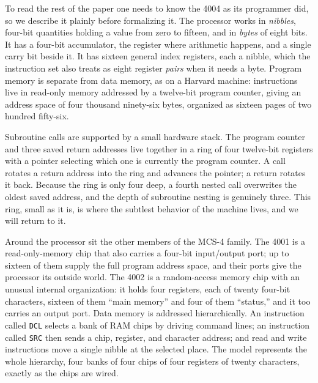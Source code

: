 \documentclass[11pt]{amsart}
\theoremstyle{plain}
\theoremstyle{definition}
\newcommand{\code}[1]{\texttt{#1}}
\begin{document}
To read the rest of the paper one needs to know the 4004 as its programmer did, so we describe it plainly before formalizing it. The processor works in \emph{nibbles}, four-bit quantities holding a value from zero to fifteen, and in \emph{bytes} of eight bits. It has a four-bit accumulator, the register where arithmetic happens, and a single carry bit beside it. It has sixteen general index registers, each a nibble, which the instruction set also treats as eight register \emph{pairs} when it needs a byte. Program memory is separate from data memory, as on a Harvard machine: instructions live in read-only memory addressed by a twelve-bit program counter, giving an address space of four thousand ninety-six bytes, organized as sixteen pages of two hundred fifty-six.

Subroutine calls are supported by a small hardware stack. The program counter and three saved return addresses live together in a ring of four twelve-bit registers with a pointer selecting which one is currently the program counter. A call rotates a return address into the ring and advances the pointer; a return rotates it back. Because the ring is only four deep, a fourth nested call overwrites the oldest saved address, and the depth of subroutine nesting is genuinely three. This ring, small as it is, is where the subtlest behavior of the machine lives, and we will return to it.

Around the processor sit the other members of the MCS-4 family. The 4001 is a read-only-memory chip that also carries a four-bit input/output port; up to sixteen of them supply the full program address space, and their ports give the processor its outside world. The 4002 is a random-access memory chip with an unusual internal organization: it holds four registers, each of twenty four-bit characters, sixteen of them ``main memory'' and four of them ``status,'' and it too carries an output port. Data memory is addressed hierarchically. An instruction called \code{DCL} selects a bank of RAM chips by driving command lines; an instruction called \code{SRC} then sends a chip, register, and character address; and read and write instructions move a single nibble at the selected place. The model represents the whole hierarchy, four banks of four chips of four registers of twenty characters, exactly as the chips are wired.
\end{document}
